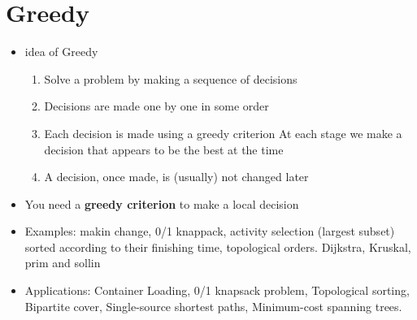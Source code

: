 \documentclass[a4paper,11pt,twoside]{book}
\begin{document}
\section{Greedy}
\begin{itemize} 

\item idea of Greedy
\begin{enumerate}
\item Solve a problem by making a sequence of decisions

\item Decisions are made one by one in some order

\item Each decision is made using a greedy criterion
At each stage we make a decision that appears to be the best at the time

\item A decision, once made, is (usually) not changed later
\end{enumerate}


\item	You need a \textbf{greedy criterion} to make a local decision 
\item 	Examples: makin change, 0/1 knappack,  activity selection (largest subset) sorted according to their finishing time, topological orders.  Dijkstra, Kruskal, prim and sollin

\item Applications: Container Loading, 0/1 knapsack problem, Topological sorting, Bipartite cover, Single-source shortest paths, Minimum-cost spanning trees. 

\end{itemize}
\end{document}
